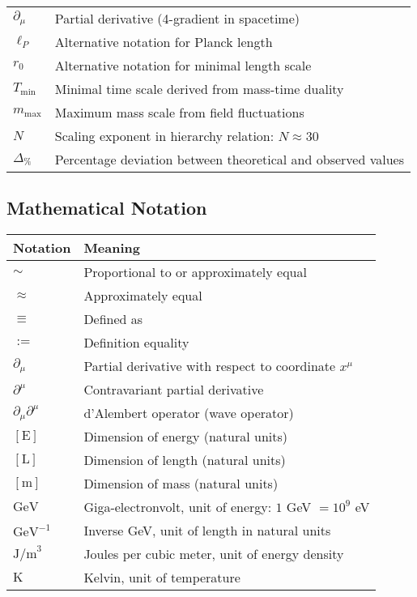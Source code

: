 \documentclass[12pt,a4paper]{article}
\numberwithin{equation}{section}
\begin{document}
\begin{longtable}{p{2cm} p{12cm}}
	$\partial_\mu$ & Partial derivative (4-gradient in spacetime) \\
	$\ell_P$ & Alternative notation for Planck length \\
	$r_0$ & Alternative notation for minimal length scale \\
	$T_{\text{min}}$ & Minimal time scale derived from mass-time duality \\
	$m_{\text{max}}$ & Maximum mass scale from field fluctuations \\
	$N$ & Scaling exponent in hierarchy relation: $N \approx 30$ \\
	$\Delta_{\%}$ & Percentage deviation between theoretical and observed values \\
	\bottomrule
\end{longtable}

\subsection*{Mathematical Notation}

\begin{longtable}{p{2cm} p{12cm}}
	\toprule
	\textbf{Notation} & \textbf{Meaning} \\
	\midrule
	\endhead
	
	$\sim$ & Proportional to or approximately equal \\
	$\approx$ & Approximately equal \\
	$\equiv$ & Defined as \\
	$:=$ & Definition equality \\
	$\partial_\mu$ & Partial derivative with respect to coordinate $x^\mu$ \\
	$\partial^\mu$ & Contravariant partial derivative \\
	$\partial_\mu \partial^\mu$ & d'Alembert operator (wave operator) \\
	$[\text{E}]$ & Dimension of energy (natural units) \\
	$[\text{L}]$ & Dimension of length (natural units) \\
	$[\text{m}]$ & Dimension of mass (natural units) \\
	$\text{GeV}$ & Giga-electronvolt, unit of energy: $1$ GeV $= 10^9$ eV \\
	$\text{GeV}^{-1}$ & Inverse GeV, unit of length in natural units \\
	$\text{J/m}^3$ & Joules per cubic meter, unit of energy density \\
	$\text{K}$ & Kelvin, unit of temperature \\
	\bottomrule
\end{longtable}
\end{document}
